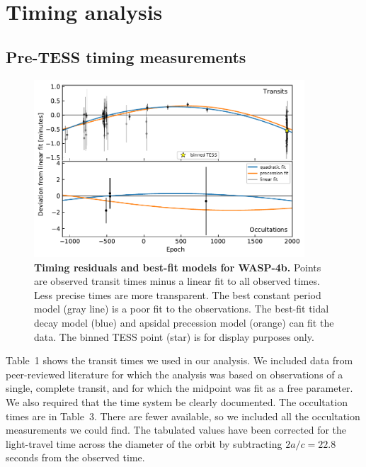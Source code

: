 \documentclass[12pt,twocolumn,tighten]{aastex62}
\begin{document}
\section{Timing analysis}
\label{sec:timing}

\subsection{Pre-TESS timing measurements}
\label{subsec:times}

\begin{figure}[t]
    \begin{center}
        \leavevmode
        \includegraphics[width=0.9\textwidth]{f3.pdf}
    \end{center}
    \vspace{-0.5cm}
    \caption{
        {\bf Timing residuals and best-fit models for WASP-4b.}
        Points are observed transit times minus a linear fit to all
        observed times.  Less precise times are more transparent.  The
        best constant period model (gray line) is a poor fit to the
        observations.  The best-fit tidal decay model (blue) and
        apsidal precession model (orange) can fit the data.  The
        binned TESS point (star) is for display purposes only.
        \label{fig:times}
    }
\end{figure}

Table~1 shows the transit times we used in our analysis.  We included
data from peer-reviewed literature for which the analysis was based on
observations of a single, complete transit, and for which the midpoint
was fit as a free parameter. We also required that the time system be
clearly documented.  The occultation times are in Table~3.  There are
fewer available, so we included all the occultation measurements we
could find. The tabulated values have been corrected for the
light-travel time across the diameter of the orbit by subtracting
$2a/c = 22.8$ seconds from the observed time.
\end{document}
